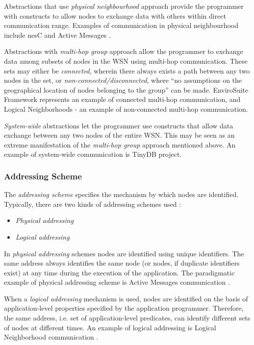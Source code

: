 Abstractions that use \emph{physical neighbourhood} approach provide
  the programmer with constructs to allow nodes to exchange data with others
  within direct communication range. Examples of communication in physical
  neighbourhood include nesC \cite{nesc:2003} and Active Messages \cite{activemessagesEicken:2001}.
  
Abstractions with \emph{multi-hop group} approach allow the
  programmer to exchange data among subsets of nodes in the WSN using
  multi-hop communication. These sets may either be
  \emph{connected}, wherein there always exists a path between any two nodes in
  the set, or \emph{non-connected/disconnected}, where ``no assumptions on the geographical location of nodes 
belonging to the group'' \cite{mottola_middleware:2008} can be made.  
  EnviroSuite Framework \cite{envirosuite:2006} represents an example of
  connected multi-hop communication, and Logical Neighborhoods
  \cite{mottola_LN:2006} - an example of non-connected multi-hop
  communication.

\emph{System-wide} abstractions let the
  programmer use constructs that allow data exchange between any two nodes
  of the entire WSN. This may be seen as an extreme manifestation of the
  \emph{multi-hop group} approach mentioned above. An example of system-wide
  communication is TinyDB \cite{madden_TinyDB:2005} project.
  
\subsubsection{Addressing Scheme}

The \emph{addressing scheme} specifies the mechanism by which nodes are
identified. Typically, there are two kinds of addressing schemes used
\cite{mottola_middleware:2008}:

\begin{itemize}
  \item \emph{Physical addressing}
  \item \emph{Logical addressing}
\end{itemize}

In \emph{physical addressing} schemes nodes are identified using unique 
  identifiers. The same address always identifies the same node (or nodes, if
  duplicate  identifiers exist) at any time during the execution of the
  application. The paradigmatic example of physical addressing scheme is Active
  Messages communication \cite{activemessagesEicken:2001}.

When a \emph{logical addressing} mechanism is used, nodes are identified on the
basis of application-level properties specified by the application
programmer. Therefore, the same address, i.e. set of
application-level predicates, can identify different sets of nodes at different
times. An example of logical addressing is Logical Neighborhood communication
\cite{mottola_LN:2006}.

